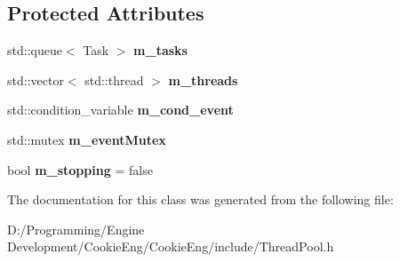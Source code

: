 \subsection*{Protected Attributes}
\begin{DoxyCompactItemize}
\item 
\mbox{\label{class_cookie_eng_1_1_threads_1_1_thread_pool_a4b2cc794349d82e9b75963d514eacdca}} 
std\+::queue$<$ Task $>$ {\bfseries m\+\_\+tasks}
\item 
\mbox{\label{class_cookie_eng_1_1_threads_1_1_thread_pool_ab8b101bddef80c83f481718a81a43945}} 
std\+::vector$<$ std\+::thread $>$ {\bfseries m\+\_\+threads}
\item 
\mbox{\label{class_cookie_eng_1_1_threads_1_1_thread_pool_a8aa7f0e105013ccb141031d5f11cd640}} 
std\+::condition\+\_\+variable {\bfseries m\+\_\+cond\+\_\+event}
\item 
\mbox{\label{class_cookie_eng_1_1_threads_1_1_thread_pool_ac3206f1c04bd54fbac38134b105ec2b3}} 
std\+::mutex {\bfseries m\+\_\+event\+Mutex}
\item 
\mbox{\label{class_cookie_eng_1_1_threads_1_1_thread_pool_aee95f4d4dd35bb62b7bb1cf05bc8802b}} 
bool {\bfseries m\+\_\+stopping} = false
\end{DoxyCompactItemize}


The documentation for this class was generated from the following file\+:\begin{DoxyCompactItemize}
\item 
D\+:/\+Programming/\+Engine Development/\+Cookie\+Eng/\+Cookie\+Eng/include/Thread\+Pool.\+h\end{DoxyCompactItemize}
